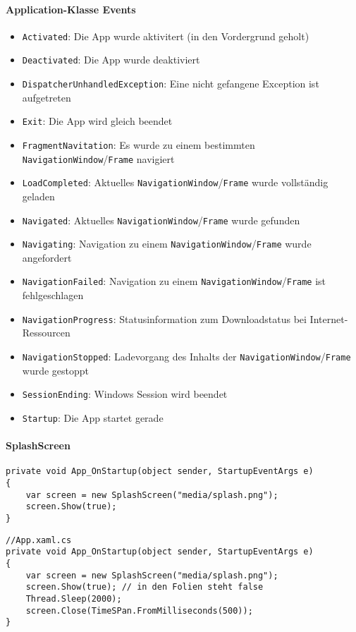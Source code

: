 \paragraph{Application-Klasse Events}
\begin{itemize}
\item \verb+Activated+: Die App wurde aktivitert (in den Vordergrund geholt)
\item \verb+Deactivated+: Die App wurde deaktiviert
\item \verb+DispatcherUnhandledException+: Eine nicht gefangene Exception ist aufgetreten
\item \verb+Exit+: Die App wird gleich beendet
\item \verb+FragmentNavitation+: Es wurde zu einem bestimmten \verb+NavigationWindow+/\verb+Frame+ navigiert
\item \verb+LoadCompleted+: Aktuelles \verb+NavigationWindow+/\verb+Frame+ wurde vollständig geladen
\item \verb+Navigated+: Aktuelles \verb+NavigationWindow+/\verb+Frame+ wurde gefunden
\item \verb+Navigating+: Navigation zu einem \verb+NavigationWindow+/\verb+Frame+  wurde angefordert
\item \verb+NavigationFailed+: Navigation zu einem \verb+NavigationWindow+/\verb+Frame+ ist fehlgeschlagen
\item \verb+NavigationProgress+: Statusinformation zum Downloadstatus bei Internet-Ressourcen
\item \verb+NavigationStopped+: Ladevorgang des Inhalts der \verb+NavigationWindow+/\verb+Frame+ wurde gestoppt
\item \verb+SessionEnding+: Windows Session wird beendet
\item \verb+Startup+: Die App startet gerade
\end{itemize}


\paragraph{SplashScreen} 
\begin{lstlisting}
private void App_OnStartup(object sender, StartupEventArgs e)
{
    var screen = new SplashScreen("media/splash.png");
    screen.Show(true);
}
\end{lstlisting}
\begin{lstlisting}
//App.xaml.cs
private void App_OnStartup(object sender, StartupEventArgs e)
{
    var screen = new SplashScreen("media/splash.png");
    screen.Show(true); // in den Folien steht false
    Thread.Sleep(2000);
    screen.Close(TimeSPan.FromMilliseconds(500));
}
\end{lstlisting}


